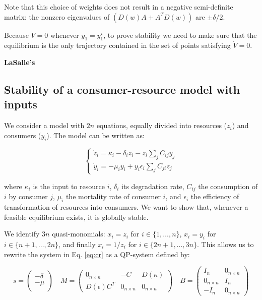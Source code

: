 \documentclass{article}
\begin{document}
Note that this choice of weights does not result in a negative
semi-definite matrix: the nonzero eigenvalues of \((D(w) A + A^T D(w))\)
are \(\pm \delta / 2\).

Because \(\dot{V} = 0\) whenever \(y_1 = y_1^\star\), to prove stability
we need to make sure that the equilibrium is the only trajectory
contained in the set of points satisfying \(\dot{V} = 0\).

\textbf{LaSalle's}

\hypertarget{stability-of-a-consumer-resource-model-with-inputs}{%
\subsection{Stability of a consumer-resource model with
inputs}\label{stability-of-a-consumer-resource-model-with-inputs}}

We consider a model with \(2n\) equations, equally divided into
resources (\(z_i\)) and consumers (\(y_i\)). The model can be written
as:

\begin{equation}
\label{eq:cr}
\begin{cases}
\dot{z}_i = \kappa_i - \delta_i z_i - z_i \sum_j C_{ij} y_j\\
\dot{y}_i = - \mu_i y_i + y_i \epsilon_i \sum_j C_{ji} z_j
\end{cases}
\end{equation}

where \(\kappa_i\) is the input to resource \(i\), \(\delta_i\) its
degradation rate, \(C_{ij}\) the consumption of \(i\) by consumer \(j\),
\(\mu_i\) the mortality rate of consumer \(i\), and \(\epsilon_i\) the
efficiency of transformation of resources into consumers. We want to
show that, whenever a feasible equilibrium exists, it is globally
stable.

We identify \(3n\) quasi-monomials: \(x_i = z_i\) for
\(i \in \{1, \ldots, n\}\), \(x_i = y_i\) for
\(i \in \{n + 1, \ldots, 2 n\}\), and finally \(x_i = 1 / z_i\) for
\(i \in \{2 n + 1, \ldots, 3 n\}\). This allows us to rewrite the system
in Eq. \ref{eq:cr} as a QP-system defined by:

\begin{equation}
\label{eq:crqp}
s = \begin{pmatrix}
-\delta \\
-\mu \\
\end{pmatrix} \quad 
M = \begin{pmatrix}
0_{n \times n} & -C & D(\kappa)\\
D(\epsilon)C^T & 0_{n \times n} & 0_{n \times n}
\end{pmatrix} \quad
B = \begin{pmatrix}
I_n & 0_{n \times n}\\
0_{n \times n} & I_n\\
-I_n & 0_{n \times n}
\end{pmatrix}
\end{equation}
\end{document}
